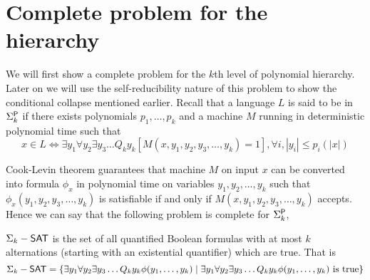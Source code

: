 \documentclass[11pt]{article}
\begin{document}

\section{Complete problem for the hierarchy}

We will first show a complete problem for the $k$th level of
polynomial hierarchy. Later on we will use the self-reducibility
nature of this problem to show the conditional collapse mentioned
earlier. Recall that a language $L$ is said to be in $\Sigma_k^\P$ 
if there exists polynomials $p_1,\dots,p_k$ and a machine $M$ running
in deterministic polynomial time such that
\begin{displaymath}
  x \in L \iff \exists y_1 \forall y_2 \exists y_3 \dots Q_k y_k
  \left[ M(x,y_1,y_2,y_3,\dots,y_k) = 1\right] , \forall i,|y_i|\leq p_i(|x|)
\end{displaymath}

Cook-Levin theorem guarantees that machine $M$ on input $x$ can be
converted into formula $\phi_x$ in polynomial time on variables
$y_1,y_2,\dots,y_k$ such that $\phi_x(y_1,y_2,y_3,\dots,y_k)$ is
satisfiable if and only if $M(x,y_1,y_2,y_3,\dots,y_k)$ accepts. Hence
we can say that the following problem is complete for $\Sigma_k^\P$,
\begin{definition} 
$\Sigma_k-\SAT$ is the set of all quantified Boolean formulas with at
most $k$ alternations (starting with an existential quantifier) which
are true. That is
\begin{displaymath}
  \Sigma_k-\SAT = \left\{ \exists y_1 \forall y_2 \exists y_3 \dots Q_k y_k
  \phi(y_1,\dots,y_k) \mid \exists y_1 \forall y_2 \exists y_3 \dots Q_k y_k
  \phi(y_1,\dots,y_k) \text{ is true} \right\}
\end{displaymath}
\end{definition}
\end{document}
